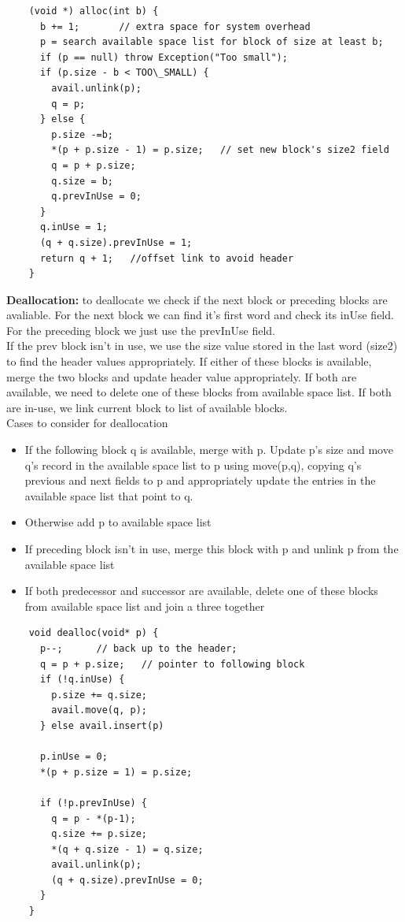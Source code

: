 \documentclass{article}
\begin{document}
  \newpage
  \begin{lstlisting}
    (void *) alloc(int b) {
      b += 1;       // extra space for system overhead
      p = search available space list for block of size at least b;
      if (p == null) throw Exception("Too small");
      if (p.size - b < TOO\_SMALL) {
        avail.unlink(p);
        q = p;
      } else {
        p.size -=b;
        *(p + p.size - 1) = p.size;   // set new block's size2 field
        q = p + p.size;
        q.size = b;
        q.prevInUse = 0;
      }
      q.inUse = 1;
      (q + q.size).prevInUse = 1;
      return q + 1;   //offset link to avoid header
    }
  \end{lstlisting}
  \textbf{Deallocation: }to deallocate we check if the next block or preceding blocks are avaliable. For the next block we can find it's first word and check its inUse field. For the preceding block we just use the prevInUse field. \\
  If the prev block isn't in use, we use the size value stored in the last word (size2) to find the header values appropriately. If either of these blocks is available, merge the two blocks and update header value appropriately. If both are available, we need to delete one of these blocks from available space list. If both are in-use, we link current block to list of available blocks.\\
  Cases to consider for deallocation
  \begin{itemize}[noitemsep]
    \item If the following block q is available, merge with p. Update p's size and move q's record in the available space list to p using move(p,q), copying q's previous and next fields to p and appropriately update the entries in the available space list that point to q. 
    \item Otherwise add p to available space list
    \item If preceding block isn't in use, merge this block with p and unlink p from the available space list
    \item If both predecessor and successor are available, delete one of these blocks from available space list and join a three together
  \end{itemize}
  \begin{lstlisting}
    void dealloc(void* p) {
      p--;      // back up to the header;
      q = p + p.size;   // pointer to following block
      if (!q.inUse) {
        p.size += q.size;
        avail.move(q, p);
      } else avail.insert(p)

      p.inUse = 0;
      *(p + p.size = 1) = p.size;

      if (!p.prevInUse) {
        q = p - *(p-1);
        q.size += p.size;
        *(q + q.size - 1) = q.size;
        avail.unlink(p);
        (q + q.size).prevInUse = 0;
      }
    }
  \end{lstlisting}
\end{document}
